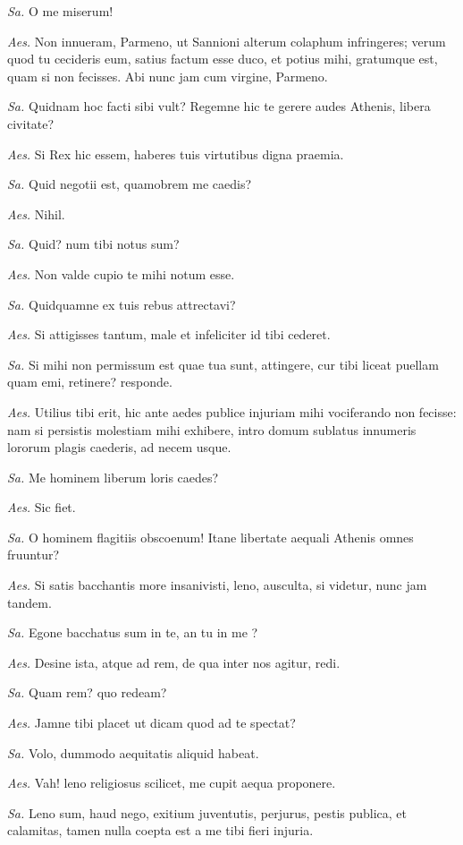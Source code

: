 {\textit{Sa.} O me miserum! 

\textit{Aes.} Non innueram, Parmeno, ut Sannioni alterum colaphum infringeres; verum quod tu cecideris eum, satius factum esse duco, et potius mihi, gratumque est, quam si non fecisses. Abi nunc jam cum virgine, Parmeno. 

\textit{Sa.} Quidnam hoc facti sibi vult? Regemne hic te gerere audes Athenis, libera civitate? 

\textit{Aes.} Si Rex hic essem, haberes tuis virtutibus digna praemia.

\textit{Sa.} Quid negotii est, quamobrem me caedis? 

\textit{Aes.} Nihil. 

\textit{Sa.} Quid? num tibi notus sum? 

\textit{Aes.} Non valde cupio te mihi notum esse. 

\textit{Sa.} Quidquamne ex tuis rebus attrectavi? 

\textit{Aes.} Si attigisses tantum, male et infeliciter id tibi cederet.

\textit{Sa.} Si mihi non permissum est quae tua sunt, attingere, cur tibi liceat puellam quam emi, retinere? responde.

\textit{Aes.} Utilius tibi erit, hic ante aedes publice injuriam mihi vociferando non fecisse: nam si persistis molestiam mihi exhibere, intro domum sublatus innumeris lororum plagis caederis, ad necem usque. 

\textit{Sa.} Me hominem liberum loris caedes? 

\textit{Aes.} Sic fiet. 

\textit{Sa.} O hominem flagitiis obscoenum! Itane libertate aequali Athenis omnes fruuntur? 

\textit{Aes.} Si satis bacchantis more insanivisti, leno, ausculta, si videtur, nunc jam tandem. 

\textit{Sa.} Egone bacchatus sum in te, an tu in me ? 

\textit{Aes.} Desine ista, atque ad rem, de qua inter nos agitur, redi. 

\textit{Sa.} Quam rem? quo redeam? 

\textit{Aes.} Jamne tibi placet ut dicam quod ad te spectat? 

\textit{Sa.} Volo, dummodo aequitatis aliquid habeat. 

\textit{Aes.} Vah! leno religiosus scilicet, me cupit aequa proponere. 

\textit{Sa.} Leno sum, haud nego, exitium juventutis, perjurus, pestis publica, et calamitas, tamen nulla coepta est a me tibi fieri injuria. 

}
